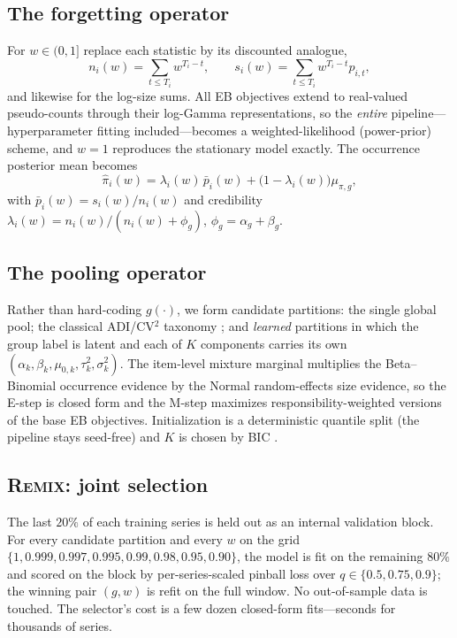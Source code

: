 \documentclass[twocolumn,10pt]{article}
\newcommand{\REMIX}{\textsc{Remix}}
\begin{document}
\subsection{The forgetting operator}\label{sec:discount}
For $w\in(0,1]$ replace each statistic by its discounted analogue,
\begin{equation}
n_i(w)=\!\sum_{t\le T_i}\! w^{T_i-t},\qquad
s_i(w)=\!\sum_{t\le T_i}\! w^{T_i-t} p_{i,t},
\label{eq:discounted-stats}
\end{equation}
and likewise for the log-size sums. All EB objectives extend to
real-valued pseudo-counts through their log-Gamma representations, so the
\emph{entire} pipeline---hyperparameter fitting included---becomes a
weighted-likelihood (power-prior) scheme, and $w{=}1$ reproduces the
stationary model exactly. The occurrence posterior mean becomes
\begin{equation}
\hat\pi_i(w)
=\lambda_i(w)\,\bar p_i(w)+\bigl(1-\lambda_i(w)\bigr)\mu_{\pi,g},
\label{eq:disc-post}
\end{equation}
with $\bar p_i(w)=s_i(w)/n_i(w)$ and credibility
$\lambda_i(w)=n_i(w)/(n_i(w)+\phi_g)$, $\phi_g=\alpha_g+\beta_g$.

\subsection{The pooling operator}\label{sec:mixture}
Rather than hard-coding $g(\cdot)$, we form candidate partitions:
the single global pool; the classical ADI/CV$^2$ taxonomy
\citep{syntetos2005categorization}; and \emph{learned} partitions in which
the group label is latent and each of $K$ components carries its own
$(\alpha_k,\beta_k,\mu_{0,k},\tau^2_k,\sigma^2_k)$. The item-level
mixture marginal multiplies the Beta--Binomial occurrence evidence by the
Normal random-effects size evidence, so the E-step is closed form and the
M-step maximizes responsibility-weighted versions of the base EB
objectives. Initialization is a deterministic quantile split (the
pipeline stays seed-free) and $K$ is chosen by BIC \citep{keribin2000}.

\subsection{\REMIX{}: joint selection}\label{sec:select}
The last $20\%$ of each training series is held out as an internal
validation block. For every candidate partition and every $w$ on the grid
$\{1,0.999,0.997,0.995,0.99,0.98,0.95,0.90\}$, the model is fit on the
remaining $80\%$ and scored on the block by per-series-scaled pinball loss
over $q\in\{0.5,0.75,0.9\}$; the winning pair $(g,w)$ is refit on the full
window. No out-of-sample data is touched. The selector's cost is a few
dozen closed-form fits---seconds for thousands of series.
\end{document}
